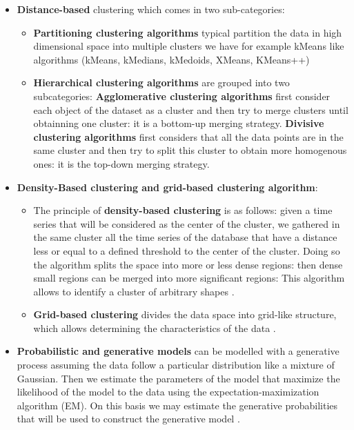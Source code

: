 \begin{itemize}
\item   \textbf{Distance-based} clustering which comes in two sub-categories:
	\begin{itemize}
	\item \textbf{Partitioning clustering algorithms} typical partition the data in        	high dimensional space into multiple clusters we have for example kMeans like 		algorithms (kMeans, kMedians, kMedoids, XMeans, KMeans++)
	\item \textbf{Hierarchical clustering algorithms} are grouped into two 				subcategories: \textbf{Agglomerative clustering algorithms} first consider each 		object of the dataset as a cluster and then try to merge clusters until  obtainning 		one cluster: it is a bottom-up merging strategy. \textbf{Divisive clustering 			algorithms} first considers that all the data points are in the same cluster 		and then try to split this cluster to obtain more homogenous ones: it is the top-down merging strategy.
	\end{itemize}
   
\item \textbf{Density-Based clustering and grid-based clustering algorithm}:
 
\begin{itemize}
	\item The principle of \textbf{density-based clustering} is as follows:   given a time 		series that will be considered as the center of the cluster, we gathered in the 		same cluster all the time series of the database that have a distance less or 		equal to a defined threshold to the center of the cluster. Doing so the 			algorithm splits the space into more or less dense regions: then dense small 			regions can be merged into more significant regions: This algorithm allows to identify a 		cluster of arbitrary shapes  \cite{kriegel2011density}.
	\item \textbf{Grid-based clustering} divides the data space into grid-like 				structure, which allows determining the characteristics of the data \cite{amini2011study}.
\end{itemize}


\item \textbf{Probabilistic and generative models} can be modelled  with a generative process assuming the data follow a particular distribution like a mixture of Gaussian. Then we estimate the parameters of the model that maximize the likelihood of the model to the data using the expectation-maximization algorithm (EM). On this basis we may estimate the generative probabilities that will be used to construct the generative model \cite{merugu2003privacy}.



\end{itemize}
